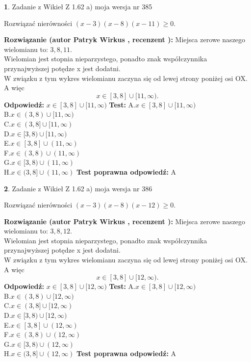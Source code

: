 \documentclass[12pt, a4paper]{article}
\theoremstyle{definition} %
\newtheorem{zad}{}
\newcommand{\zadStart}[1]{\begin{zad}#1\newline}
\newcommand{\zadStop}{\end{zad}}
\newcommand{\rozwStart}[2]{\noindent \textbf{Rozwiązanie (autor #1 , recenzent #2): }\newline}
\newcommand{\rozwStop}{\newline}
\newcommand{\odpStart}{\noindent \textbf{Odpowiedź:}\newline}
\newcommand{\odpStop}{\newline}
\newcommand{\testStart}{\noindent \textbf{Test:}\newline}
\newcommand{\testStop}{\newline}
\newcommand{\kluczStart}{\noindent \textbf{Test poprawna odpowiedź:}\newline}
\newcommand{\kluczStop}{\newline}
\begin{document}
\zadStart{Zadanie z Wikieł Z 1.62 a) moja wersja nr 385}

Rozwiązać nierówności $(x-3)(x-8)(x-11)\ge0$.
\zadStop
\rozwStart{Patryk Wirkus}{}
Miejsca zerowe naszego wielomianu to: $3, 8, 11$.\\
Wielomian jest stopnia nieparzystego, ponadto znak współczynnika przy\linebreak najwyższej potędze x jest dodatni.\\ W związku z tym wykres wielomianu zaczyna się od lewej strony poniżej osi OX. A więc $$x \in [3,8] \cup [11,\infty).$$
\rozwStop
\odpStart
$x \in [3,8] \cup [11,\infty)$
\odpStop
\testStart
A.$x \in [3,8] \cup [11,\infty)$\\
B.$x \in (3,8) \cup [11,\infty)$\\
C.$x \in (3,8] \cup [11,\infty)$\\
D.$x \in [3,8) \cup [11,\infty)$\\
E.$x \in [3,8] \cup (11,\infty)$\\
F.$x \in (3,8) \cup (11,\infty)$\\
G.$x \in [3,8) \cup (11,\infty)$\\
H.$x \in (3,8] \cup (11,\infty)$
\testStop
\kluczStart
A
\kluczStop



\zadStart{Zadanie z Wikieł Z 1.62 a) moja wersja nr 386}

Rozwiązać nierówności $(x-3)(x-8)(x-12)\ge0$.
\zadStop
\rozwStart{Patryk Wirkus}{}
Miejsca zerowe naszego wielomianu to: $3, 8, 12$.\\
Wielomian jest stopnia nieparzystego, ponadto znak współczynnika przy\linebreak najwyższej potędze x jest dodatni.\\ W związku z tym wykres wielomianu zaczyna się od lewej strony poniżej osi OX. A więc $$x \in [3,8] \cup [12,\infty).$$
\rozwStop
\odpStart
$x \in [3,8] \cup [12,\infty)$
\odpStop
\testStart
A.$x \in [3,8] \cup [12,\infty)$\\
B.$x \in (3,8) \cup [12,\infty)$\\
C.$x \in (3,8] \cup [12,\infty)$\\
D.$x \in [3,8) \cup [12,\infty)$\\
E.$x \in [3,8] \cup (12,\infty)$\\
F.$x \in (3,8) \cup (12,\infty)$\\
G.$x \in [3,8) \cup (12,\infty)$\\
H.$x \in (3,8] \cup (12,\infty)$
\testStop
\kluczStart
A
\kluczStop
\end{document}
